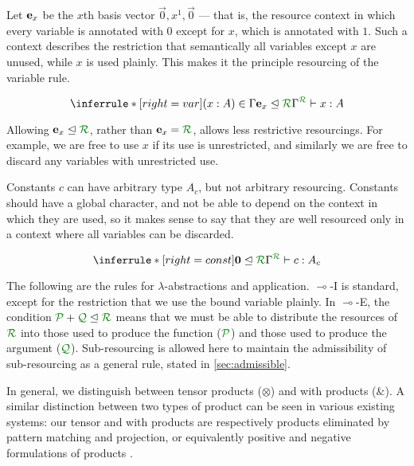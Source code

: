 Let $\mathbf{e}_{x}$ be the $x$th basis vector $\vec 0, x^1, \vec 0$ --- that is, the
resource context in which every variable is annotated with $0$ except for $x$,
which is annotated with $1$.
Such a context describes the restriction that semantically all variables except
$x$ are unused, while $x$ is used plainly.
This makes it the principle resourcing of the variable rule.

\[
  \inferrule*[right=var]
  {(x : A) \in \Gamma
    \\ \subrctx{\basis x}{\resctx R}
  }
  {\ctx{\Gamma}{R} \vdash x : A}
\]

Allowing $\basis x \subres \resctx R$, rather than $\basis x = \resctx R$,
allows less restrictive resourcings.
For example, we are free to use $x$ if its use is unrestricted, and similarly we
are free to discard any variables with unrestricted use.

Constants $c$ can have arbitrary type $A_c$, but not arbitrary resourcing.
Constants should have a global character, and not be able to depend on the
context in which they are used, so it makes sense to say that they are well
resourced only in a context where all variables can be discarded.

\[
  \inferrule*[right=const]
  {\subrctx{\vct 0}{\resctx R}}
  {\ctx{\Gamma}{R} \vdash c : A_c}
\]

The following are the rules for $\lambda$-abstractions and application.
$\multimap$-I is standard, except for the restriction that we use the bound
variable plainly.
In $\multimap$-E, the condition $\resctx P + \resctx Q \subres \resctx R$
means that we must be able to distribute the resources of $\resctx R$ into
those used to produce the function ($\resctx P$) and those used to produce the
argument ($\resctx Q$).
Sub-resourcing is allowed here to maintain the admissibility of sub-resourcing
as a general rule, stated in \autoref{sec:admissible}.


In general, we distinguish between tensor products ($\otimes$) and with products
($\&$).
A similar distinction between two types of product can be seen in various
existing systems: our tensor and with products are respectively products
eliminated by pattern matching and projection, or equivalently positive and
negative formulations of products .

